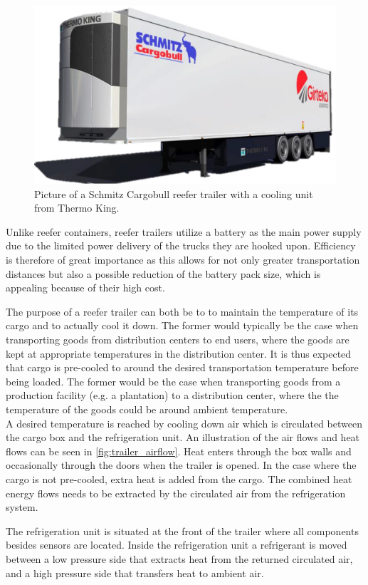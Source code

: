 \begin{figure}[h]
	\centering
	\includegraphics[width = 0.55\linewidth]{Graphics/3d_draw_trailer.jpg}
	\caption{Picture of a Schmitz Cargobull reefer trailer with a cooling unit from Thermo King.}
	\label{fig:trailer_picture}
\end{figure}

Unlike reefer containers, reefer trailers utilize a battery as the main power supply due to the limited power delivery of the trucks they are hooked upon. Efficiency is therefore of great importance as this allows for not only greater transportation distances but also a possible reduction of the battery pack size, which is appealing because of their high cost.

The purpose of a reefer trailer can both be to to maintain the temperature of its cargo and to actually cool it down. The former would typically be the case when transporting goods from distribution centers to end users, where the goods are kept at appropriate temperatures in the distribution center. It is thus expected that cargo is pre-cooled to around the desired transportation temperature before being loaded.
The former would be the case when transporting goods from a production facility (e.g. a plantation) to a distribution center, where the the temperature of the goods could be around ambient temperature.\\

A desired temperature is reached by cooling down air which is circulated between the cargo box and the refrigeration unit. An illustration of the air flows and heat flows can be seen in \cref{fig:trailer_airflow}. Heat enters through the box walls and occasionally through the doors when the trailer is opened. In the case where the cargo is not pre-cooled, extra heat is added from the cargo. The combined heat energy flows needs to be extracted by the circulated air from the refrigeration system.

The refrigeration unit is situated at the front of the trailer where all components besides sensors are located. Inside the refrigeration unit a refrigerant is moved between a low pressure side that extracts heat from the returned circulated air, and a high pressure side that transfers heat to ambient air.

